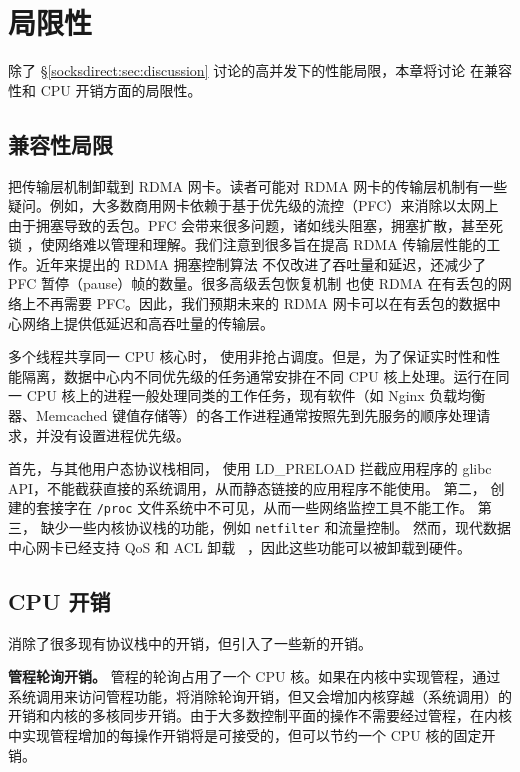 \section{局限性}
\label{sockdirect:sec:limitation}

除了 \S\ref{socksdirect:sec:discussion} 讨论的高并发下的性能局限，本章将讨论 \sys{} 在兼容性和 CPU 开销方面的局限性。

\subsection{兼容性局限}



\sys{} 把传输层机制卸载到 RDMA 网卡。读者可能对 RDMA 网卡的传输层机制有一些疑问。例如，大多数商用网卡依赖于基于优先级的流控（PFC）来消除以太网上由于拥塞导致的丢包。PFC 会带来很多问题，诸如线头阻塞，拥塞扩散，甚至死锁 \cite{guo2016rdma}，使网络难以管理和理解。我们注意到很多旨在提高 RDMA 传输层性能的工作。近年来提出的 RDMA 拥塞控制算法 \cite{zhu2015congestion,mprdma,mittal2015timely,hpcc} 不仅改进了吞吐量和延迟，还减少了 PFC 暂停（pause）帧的数量。很多高级丢包恢复机制 \cite{mittal2018revisiting,lu2017memory} 也使 RDMA 在有丢包的网络上不再需要 PFC。因此，我们预期未来的 RDMA 网卡可以在有丢包的数据中心网络上提供低延迟和高吞吐量的传输层。

多个线程共享同一 CPU 核心时，\sys{} 使用非抢占调度。但是，为了保证实时性和性能隔离，数据中心内不同优先级的任务通常安排在不同 CPU 核上处理。运行在同一 CPU 核上的进程一般处理同类的工作任务，现有软件（如 Nginx 负载均衡器、Memcached 键值存储等）的各工作进程通常按照先到先服务的顺序处理请求，并没有设置进程优先级。

首先，与其他用户态协议栈相同，\libipc{} 使用 LD\_PRELOAD 拦截应用程序的 glibc API，不能截获直接的系统调用，从而静态链接的应用程序不能使用。
第二，\sys{} 创建的套接字在 \texttt{/proc} 文件系统中不可见，从而一些网络监控工具不能工作。
第三，\sys{} 缺少一些内核协议栈的功能，例如 \texttt{netfilter} 和流量控制。
然而，现代数据中心网卡已经支持 QoS 和 ACL 卸载 ~\cite{mellanox}，因此这些功能可以被卸载到硬件。

\subsection{CPU 开销}

\sys{} 消除了很多现有协议栈中的开销，但引入了一些新的开销。

\textbf{管程轮询开销。}
管程的轮询占用了一个 CPU 核。如果在内核中实现管程，通过系统调用来访问管程功能，将消除轮询开销，但又会增加内核穿越（系统调用）的开销和内核的多核同步开销。由于大多数控制平面的操作不需要经过管程，在内核中实现管程增加的每操作开销将是可接受的，但可以节约一个 CPU 核的固定开销。

